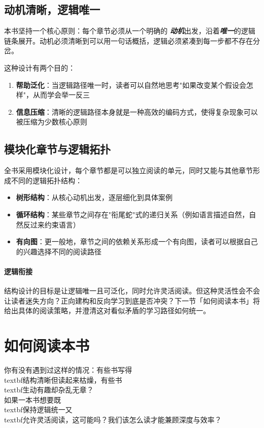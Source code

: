 \documentclass[openany, a4paper, 12pt]{book}
\begin{document}
	\subsection{ 动机清晰，逻辑唯一}


本书坚持一个核心原则：每个章节必须从一个明确的
{\large \emph{\textbf{动机}}}出发，沿着{\large \emph{\textbf{唯一}}}的逻辑链条展开。动机必须清晰到可以用一句话概括，逻辑必须紧凑到每一步都不存在分岔。

	这种设计有两个目的：
	\begin{enumerate}
		\item \textbf{帮助泛化}：当逻辑路径唯一时，读者可以自然地思考"如果改变某个假设会怎样"，从而学会举一反三
		\item \textbf{信息压缩}：清晰的逻辑路径本身就是一种高效的编码方式，使得复杂现象可以被压缩为少数核心原则
	\end{enumerate}

	\subsection{模块化章节与逻辑拓扑}

全书采用模块化设计，每个章节都是可以独立阅读的单元，同时又能与其他章节形成不同的逻辑拓扑结构：
	\begin{itemize}
		\item \textbf{树形结构}：从核心动机出发，逐层细化到具体案例
		\item \textbf{循环结构}：某些章节之间存在"衔尾蛇"式的递归关系（例如语言描述自然，自然反过来约束语言）
		\item \textbf{有向图}：更一般地，章节之间的依赖关系形成一个有向图，读者可以根据自己的兴趣选择不同的阅读路径
	\end{itemize}

	\paragraph*{逻辑衔接}
	结构设计的目标是让逻辑唯一且可泛化，同时允许灵活阅读。但这种灵活性会不会让读者迷失方向？正向建构和反向学习到底是否冲突？下一节「如何阅读本书」将给出具体的阅读策略，并澄清这对看似矛盾的学习路径如何统一。

	\section{如何阅读本书}

	\begin{readingnote}
		你有没有遇到过这样的情况：有些书写得\\textbf{结构清晰}但读起来枯燥，有些书\\textbf{生动有趣}却杂乱无章？\\
		如果一本书想要既\\textbf{保持逻辑统一}又\\textbf{允许灵活阅读}，这可能吗？我们该怎么读才能兼顾深度与效率？
	\end{readingnote}
\end{document}
